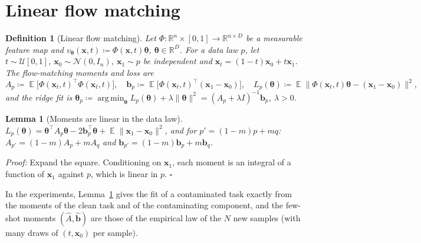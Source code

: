 \documentclass{article}
\DeclareMathOperator*{\argmin}{arg\,min}
\DeclareMathOperator{\E}{\mathbb{E}}
\newcommand{\RR}{\mathbb{R}}
\newcommand{\bth}{\boldsymbol{\theta}}
\newcommand{\bx}{\mathbf{x}}
\theoremstyle{plain}
\newtheorem{lemma}{Lemma}
\newtheorem{definition}{Definition}
\begin{document}
\section{Linear flow matching}\label{sec:linear}

\begin{definition}[Linear flow matching]\label{def:lfm}
Let $\Phi:\RR^n\times[0,1]\to\RR^{n\times D}$ be a measurable feature map and
$v_{\bth}(\bx,t)\coloneqq\Phi(\bx,t)\bth$, $\bth\in\RR^D$. For a data law $p$, let $t\sim\mathcal{U}[0,1]$,
$\bx_0\sim\mathcal{N}(0,I_n)$, $\bx_1\sim p$ be independent and $\bx_t=(1-t)\bx_0+t\bx_1$. The
flow-matching moments and loss are
\[
  A_p\coloneqq\E\big[\Phi(\bx_t,t)^\top\Phi(\bx_t,t)\big],\quad
  \mathbf{b}_p\coloneqq\E\big[\Phi(\bx_t,t)^\top(\bx_1-\bx_0)\big],\quad
  L_p(\bth)\coloneqq\E\|\Phi(\bx_t,t)\bth-(\bx_1-\bx_0)\|^2,
\]
and the ridge fit is $\bth_p\coloneqq\argmin_{\bth} L_p(\bth)+\lambda\|\bth\|^2=(A_p+\lambda I)^{-1}\mathbf{b}_p$,
$\lambda>0$.
\end{definition}

\begin{lemma}[Moments are linear in the data law]\label{lem:moments}
$L_p(\bth)=\bth^\top A_p\bth-2\mathbf{b}_p^\top\bth+\E\|\bx_1-\bx_0\|^2$, and for $p'=(1-m)p+mq$:
$A_{p'}=(1-m)A_p+mA_q$ and $\mathbf{b}_{p'}=(1-m)\mathbf{b}_p+m\mathbf{b}_q$.
\end{lemma}
\textit{Proof:} Expand the square. Conditioning on $\bx_1$, each moment is an integral of a
function of $\bx_1$ against $p$, which is linear in $p$. \hfill $\square$

In the experiments, Lemma~\ref{lem:moments} gives the fit of a contaminated task exactly from the
moments of the clean task and of the contaminating component, and the few-shot moments
$(\hat A,\hat{\mathbf{b}})$ are those of the empirical law of the $N$ new samples (with many draws of
$(t,\bx_0)$ per sample).
\end{document}
